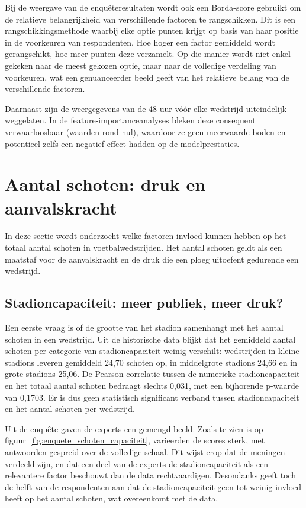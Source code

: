 Bij de weergave van de enquêteresultaten wordt ook een Borda-score gebruikt om de relatieve belangrijkheid van verschillende factoren te rangschikken.
Dit is een rangschikkingsmethode waarbij elke optie punten krijgt op basis van haar positie in de voorkeuren van respondenten.
Hoe hoger een factor gemiddeld wordt gerangschikt, hoe meer punten deze verzamelt.
Op die manier wordt niet enkel gekeken naar de meest gekozen optie, maar naar de volledige verdeling van voorkeuren,
wat een genuanceerder beeld geeft van het relatieve belang van de verschillende factoren.

Daarnaast zijn de weergegevens van de 48 uur vóór elke wedstrijd uiteindelijk weggelaten. 
In de feature‑importanceanalyses bleken deze consequent verwaarloosbaar (waarden rond nul), 
waardoor ze geen meerwaarde boden en potentieel zelfs een negatief effect hadden op de modelprestaties.

\section{Aantal schoten: druk en aanvalskracht}

In deze sectie wordt onderzocht welke factoren invloed kunnen hebben op het totaal aantal schoten in voetbalwedstrijden.
Het aantal schoten geldt als een maatstaf voor de aanvalskracht en de druk die een ploeg uitoefent gedurende een wedstrijd.

\subsection{Stadioncapaciteit: meer publiek, meer druk?}

Een eerste vraag is of de grootte van het stadion samenhangt met het aantal schoten in een wedstrijd.
Uit de historische data blijkt dat het gemiddeld aantal schoten per categorie van stadioncapaciteit weinig verschilt:
wedstrijden in kleine stadions leveren gemiddeld 24,70 schoten op, in middelgrote stadions 24,66 en in grote stadions 25,06.
De Pearson correlatie tussen de numerieke stadioncapaciteit en het totaal aantal schoten bedraagt slechts 0,031, met een bijhorende p-waarde van 0,1703.
Er is dus geen statistisch significant verband tussen stadioncapaciteit en het aantal schoten per wedstrijd.

\vspace{5pt}

Uit de enquête gaven de experts een gemengd beeld.
Zoals te zien is op figuur~\ref{fig:enquete_schoten_capaciteit}, varieerden de scores sterk, met antwoorden gespreid over de volledige schaal.
Dit wijst erop dat de meningen verdeeld zijn, en dat een deel van de experts de stadioncapaciteit als een relevantere factor beschouwt dan de data rechtvaardigen.
Desondanks geeft toch de helft van de respondenten aan dat de stadioncapaciteit geen tot weinig invloed heeft op het aantal schoten, wat overeenkomt met de data.

